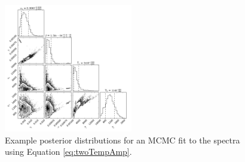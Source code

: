 \documentclass[twocolumn]{aastex6}
\begin{document}
\begin{figure}
\begin{centering}
\includegraphics[width=0.5\textwidth]{corner_fit_2temp.pdf}
\caption{Example posterior distributions for an MCMC fit to the spectra using Equation \ref{eq:twoTempAmp}.}\label{fig:post2Tempfit}
\end{centering}
\end{figure}






\end{document}
